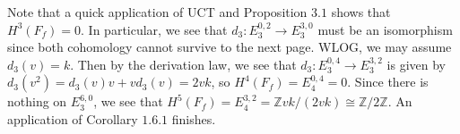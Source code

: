 \documentclass{article}
\theoremstyle{definition}
\theoremstyle{definition}
\theoremstyle{definition}
\theoremstyle{definition}
\theoremstyle{definition}
\theoremstyle{definition}
\theoremstyle{definition}
\begin{document}
Note that a quick application of UCT and Proposition $3.1$ shows that $H^3(F_f)=0$. In particular, we see that $d_3: E_3^{0,2}\to E_3^{3,0}$ must be an isomorphism since both cohomology cannot survive to the next page. WLOG, we may assume $d_3(v)=k$. Then by the derivation law, we see that $d_3: E_3^{0,4}\to E_3^{3,2}$ is given by $d_3(v^2)=d_3(v)v+vd_3(v)=2vk$, so $H^4(F_f)=E_4^{0,4}=0$. Since there is nothing on $E_3^{6,0}$, we see that $H^5(F_f)=E_4^{3,2}=\mathbb{Z}vk/(2vk)\cong \mathbb{Z}/2 \mathbb{Z}$. An application of Corollary $1.6.1$ finishes.
\end{document}

